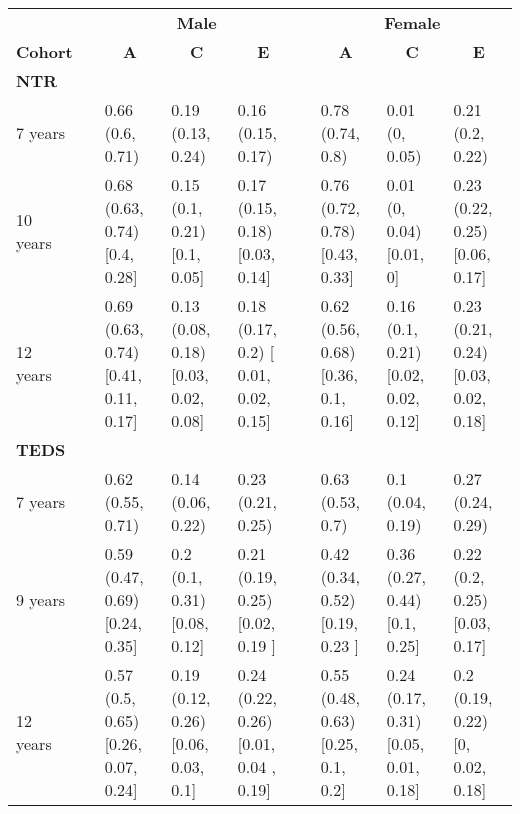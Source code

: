     \begin{tabular}{lrlllrlll}
    \toprule
          &       & \multicolumn{3}{c}{\textbf{Male}} &       & \multicolumn{3}{c}{\textbf{Female}} \\
\cmidrule{3-5}\cmidrule{7-9}    \multicolumn{1}{c}{\textbf{Cohort}} &       & \multicolumn{1}{c}{\textbf{A}} & \multicolumn{1}{c}{\textbf{C}} & \multicolumn{1}{c}{\textbf{E}} &       & \multicolumn{1}{c}{\textbf{A}} & \multicolumn{1}{c}{\textbf{C}} & \multicolumn{1}{c}{\textbf{E}} \\
    \midrule
    \multicolumn{9}{l}{\textbf{NTR}} \\
    7 years &       & 0.66 (0.6, 0.71)  & 0.19 (0.13, 0.24)  & 0.16 (0.15, 0.17)  &       & 0.78 (0.74, 0.8)  & 0.01 (0, 0.05)  & 0.21 (0.2, 0.22)  \\
    10 years &       & 0.68 (0.63, 0.74)     [0.4, 0.28] & 0.15 (0.1, 0.21) [0.1, 0.05] & 0.17 (0.15, 0.18) [0.03, 0.14] &       & 0.76 (0.72, 0.78) [0.43, 0.33] & 0.01 (0, 0.04) [0.01, 0] & 0.23 (0.22, 0.25) [0.06, 0.17] \\
    12 years &       & 0.69 (0.63, 0.74) [0.41, 0.11, 0.17] & 0.13 (0.08, 0.18) [0.03, 0.02, 0.08] & 0.18 (0.17, 0.2) [ 0.01, 0.02, 0.15] &       & 0.62 (0.56, 0.68) [0.36, 0.1, 0.16] & 0.16 (0.1, 0.21) [0.02, 0.02, 0.12] & 0.23 (0.21, 0.24) [0.03, 0.02, 0.18] \\
    \multicolumn{9}{l}{\textbf{TEDS}} \\
    7 years &       & 0.62 (0.55, 0.71)  & 0.14 (0.06, 0.22) & 0.23 (0.21, 0.25) &       & 0.63 (0.53, 0.7) & 0.1 (0.04, 0.19) & 0.27 (0.24, 0.29) \\
    9 years &       & 0.59 (0.47, 0.69) [0.24, 0.35] & 0.2 (0.1, 0.31) [0.08, 0.12] & 0.21 (0.19, 0.25) [0.02, 0.19 ] &       & 0.42 (0.34, 0.52) [0.19, 0.23 ] & 0.36 (0.27, 0.44) [0.1, 0.25] & 0.22 (0.2, 0.25) [0.03, 0.17] \\
    12 years &       & 0.57 (0.5, 0.65) [0.26, 0.07, 0.24] & 0.19 (0.12, 0.26) [0.06, 0.03, 0.1] & 0.24 (0.22, 0.26) [0.01, 0.04 , 0.19] &       & 0.55 (0.48, 0.63) [0.25, 0.1, 0.2] & 0.24 (0.17, 0.31) [0.05, 0.01, 0.18] & 0.2 (0.19, 0.22)  [0, 0.02, 0.18] \\
    \bottomrule
    \end{tabular}%
